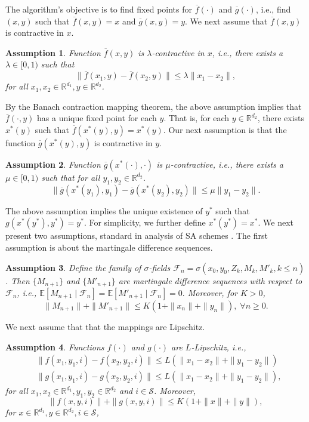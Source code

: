 \documentclass[letterpaper, 10 pt, conference]{ieeeconf}  %
\theoremstyle{definition}
\theoremstyle{plain}
\newtheorem{assumption}{Assumption}
\newcommand{\barf}{\overline{f}}
\newcommand{\barg}{\overline{g}}
\newcommand{\xstar}{x^*}
\newcommand{\ystar}{y^*}
\newcommand{\Scal}{\mathcal{S}}
\newcommand{\RR}{\mathbb{R}}
\newcommand{\EE}{\mathbb{E}}
\newcommand{\FF}{\mathcal{F}}
\begin{document}
The algorithm's objective is to find fixed points for $\barf(\cdot)$ and $\barg(\cdot)$, i.e., find $(x,y)$ such that $\barf(x,y)=x$ and $\barg(x,y)=y$. We next assume that $\barf(x,y)$ is contractive in $x$. 
\begin{assumption}\label{assu-contractive-f}
Function $\barf(x,y)$ is $\lambda$-contractive in $x$, i.e., there exists a $\lambda\in [0,1)$ such that 
\begin{equation}
    \|\barf(x_1,y)-\barf(x_2,y)\|\leq \lambda \|x_1-x_2\|,
\end{equation}
for all $x_1,x_2\in\RR^{d_1}, y\in\RR^{d_2}$.
\end{assumption}
By the Banach contraction mapping theorem, the above assumption implies that $\barf(\cdot,y)$ has a unique fixed point for each $y$. That is, for each $y\in\RR^{d_2}$, there exists $\xstar(y)$ such that $\barf(\xstar(y),y)=\xstar(y)$. Our next assumption is that the function $\barg(\xstar(y),y)$ is contractive in $y$.
\begin{assumption}\label{assu-contractive-g}
Function $\barg(\xstar(\cdot),\cdot)$ is $\mu$-contractive, i.e., there exists a $\mu\in [0,1)$ such that for all $y_1,y_2\in\RR^{d_2}$.
\begin{equation}
    \|\barg(\xstar(y_1),y_1)-\barg(\xstar(y_2),y_2)\|\leq \mu \|y_1-y_2\|.
\end{equation}
\end{assumption}
The above assumption implies the unique existence of $\ystar$ such that $g(\xstar(\ystar),\ystar)=\ystar$. For simplicity, we further define $\xstar(\ystar)=\xstar$. We next present two assumptions, standard in analysis of SA schemes \cite{Borkar-book, Chandak_conc}. The first assumption is about the martingale difference sequences. 
\begin{assumption}\label{assu-Martingale}
    Define the family of $\sigma$-fields $\FF_n=\sigma(x_0,y_0,Z_k,M_k,M'_k, k\leq n)$. Then $\{M_{n+1}\}$ and $\{M'_{n+1}\}$ are martingale difference sequences with respect to $\FF_n$, i.e., $\EE[M_{n+1}\mid\FF_n]=\EE[M'_{n+1}\mid\FF_n]=0.$
Moreover, for $K>0$,
    $$\|M_{n+1}\|+\|M'_{n+1}\|\leq K(1+\|x_n\|+\|y_n\|),\;\forall n\geq 0.$$
\end{assumption}
We next assume that that the mappings are Lipschitz.

\begin{assumption}\label{assu-Lipschitz}
Functions $f(\cdot)$ and $g(\cdot)$ are $L$-Lipschitz, i.e.,
\begin{align*}
    &\|f(x_1,y_1,i)-f(x_2,y_2,i)\|\leq L(\|x_1-x_2\|+\|y_1-y_2\|)\\
    &\|g(x_1,y_1,i)-g(x_2,y_2,i)\|\leq L(\|x_1-x_2\|+\|y_1-y_2\|),
\end{align*}
for all $x_1,x_2\in\RR^{d_1}, y_1,y_2\in\RR^{d_2}$ and $i\in\Scal$. Moreover,
$$\|f(x,y,i)\|+\|g(x,y,i)\|\leq K(1+\|x\|+\|y\|),$$
for $x\in\RR^{d_1}, y\in\RR^{d_2},i\in\Scal$,
\end{assumption}
\end{document}
